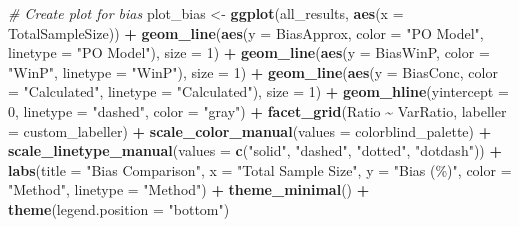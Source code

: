 \documentclass[
  letterpaper,
  DIV=11,
  numbers=noendperiod]{scrartcl}
\newenvironment{Shaded}{\begin{snugshade}}{\end{snugshade}}
\newcommand{\AttributeTok}[1]{\textcolor[rgb]{0.13,0.29,0.53}{#1}}
\newcommand{\CommentTok}[1]{\textcolor[rgb]{0.56,0.35,0.01}{\textit{#1}}}
\newcommand{\DecValTok}[1]{\textcolor[rgb]{0.00,0.00,0.81}{#1}}
\newcommand{\FunctionTok}[1]{\textcolor[rgb]{0.13,0.29,0.53}{\textbf{#1}}}
\newcommand{\NormalTok}[1]{#1}
\newcommand{\OtherTok}[1]{\textcolor[rgb]{0.56,0.35,0.01}{#1}}
\newcommand{\SpecialCharTok}[1]{\textcolor[rgb]{0.81,0.36,0.00}{\textbf{#1}}}
\newcommand{\StringTok}[1]{\textcolor[rgb]{0.31,0.60,0.02}{#1}}
\begin{document}
\begin{Shaded}
\begin{Highlighting}[]
\CommentTok{\# Create plot for bias}
\NormalTok{plot\_bias }\OtherTok{\textless{}{-}} \FunctionTok{ggplot}\NormalTok{(all\_results, }\FunctionTok{aes}\NormalTok{(}\AttributeTok{x =}\NormalTok{ TotalSampleSize)) }\SpecialCharTok{+}
  \FunctionTok{geom\_line}\NormalTok{(}\FunctionTok{aes}\NormalTok{(}\AttributeTok{y =}\NormalTok{ BiasApprox, }\AttributeTok{color =} \StringTok{"PO Model"}\NormalTok{, }\AttributeTok{linetype =} \StringTok{"PO Model"}\NormalTok{), }\AttributeTok{size =} \DecValTok{1}\NormalTok{) }\SpecialCharTok{+}
  \FunctionTok{geom\_line}\NormalTok{(}\FunctionTok{aes}\NormalTok{(}\AttributeTok{y =}\NormalTok{ BiasWinP, }\AttributeTok{color =} \StringTok{"WinP"}\NormalTok{, }\AttributeTok{linetype =} \StringTok{"WinP"}\NormalTok{), }\AttributeTok{size =} \DecValTok{1}\NormalTok{) }\SpecialCharTok{+}
  \FunctionTok{geom\_line}\NormalTok{(}\FunctionTok{aes}\NormalTok{(}\AttributeTok{y =}\NormalTok{ BiasConc, }\AttributeTok{color =} \StringTok{"Calculated"}\NormalTok{, }\AttributeTok{linetype =} \StringTok{"Calculated"}\NormalTok{), }\AttributeTok{size =} \DecValTok{1}\NormalTok{) }\SpecialCharTok{+}
  \FunctionTok{geom\_hline}\NormalTok{(}\AttributeTok{yintercept =} \DecValTok{0}\NormalTok{, }\AttributeTok{linetype =} \StringTok{"dashed"}\NormalTok{, }\AttributeTok{color =} \StringTok{"gray"}\NormalTok{) }\SpecialCharTok{+}
  \FunctionTok{facet\_grid}\NormalTok{(Ratio }\SpecialCharTok{\textasciitilde{}}\NormalTok{ VarRatio, }\AttributeTok{labeller =}\NormalTok{ custom\_labeller) }\SpecialCharTok{+}
  \FunctionTok{scale\_color\_manual}\NormalTok{(}\AttributeTok{values =}\NormalTok{ colorblind\_palette) }\SpecialCharTok{+}
  \FunctionTok{scale\_linetype\_manual}\NormalTok{(}\AttributeTok{values =} \FunctionTok{c}\NormalTok{(}\StringTok{"solid"}\NormalTok{, }\StringTok{"dashed"}\NormalTok{, }\StringTok{"dotted"}\NormalTok{, }\StringTok{"dotdash"}\NormalTok{)) }\SpecialCharTok{+}
  \FunctionTok{labs}\NormalTok{(}\AttributeTok{title =} \StringTok{"Bias Comparison"}\NormalTok{, }
       \AttributeTok{x =} \StringTok{"Total Sample Size"}\NormalTok{, }
       \AttributeTok{y =} \StringTok{"Bias (\%)"}\NormalTok{, }
       \AttributeTok{color =} \StringTok{"Method"}\NormalTok{, }
       \AttributeTok{linetype =} \StringTok{"Method"}\NormalTok{) }\SpecialCharTok{+}
  \FunctionTok{theme\_minimal}\NormalTok{() }\SpecialCharTok{+}
  \FunctionTok{theme}\NormalTok{(}\AttributeTok{legend.position =} \StringTok{"bottom"}\NormalTok{)}


\end{Highlighting}
\end{Shaded}
\end{document}

